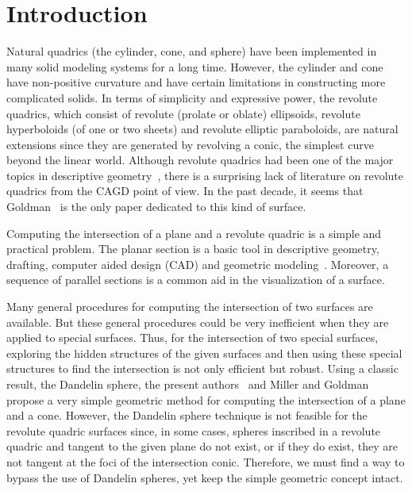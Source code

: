 \section{Introduction}
\label{section:intro}

     Natural quadrics (the cylinder, cone, and sphere)
have been implemented in many solid modeling systems for
a long time.  However, the cylinder and cone have non-positive
curvature and have certain limitations in constructing more complicated solids.
In terms of simplicity and expressive power, the revolute quadrics, which
consist of revolute (prolate or oblate) ellipsoids, revolute hyperboloids
(of one or two sheets) and revolute elliptic paraboloids, are natural
extensions since they are generated by revolving a conic, the simplest curve
beyond the linear world.  Although revolute quadrics had been one of the major
topics in descriptive
geometry~\cite{bereis:1964,schmid:1912,slaby:1966,strubecker:1958}, there is a
surprising lack of literature on revolute quadrics from the CAGD point of view.
In the past decade, it seems that Goldman~\cite{goldman:1983a} is the only
paper dedicated to this kind of surface.

     Computing the intersection of a plane and a revolute quadric is a simple
and practical problem.  The planar section is a basic tool in descriptive
geometry, drafting, computer aided design (CAD) and geometric
modeling~\cite{adams:1988,ding-davis:1987,hosaka:1992,ryan:1991}.
Moreover, a sequence of parallel sections is
a common aid in the visualization of a surface.

     Many general procedures for computing the intersection of two surfaces are
available.  But these general procedures could be very inefficient when they
are applied to special surfaces.  Thus, for the intersection of two special
surfaces, exploring the hidden structures of the given surfaces and then using
these special structures to find the intersection is not only efficient
but robust.  Using a classic result, the Dandelin sphere, the present
authors~\cite{johnstone-shene:1991} and Miller and
Goldman~\cite{miller-goldman:1991a} propose a very simple
geometric method for computing the intersection of a plane and a cone.
However, the Dandelin sphere technique is not feasible for the revolute
quadric surfaces since, in some cases, spheres inscribed in a revolute quadric
and tangent to the given plane do not exist, or if they do exist, they are not
tangent at the foci of the intersection conic.  Therefore, we must find a
way to bypass the use of Dandelin spheres, yet keep the simple
geometric concept intact.

